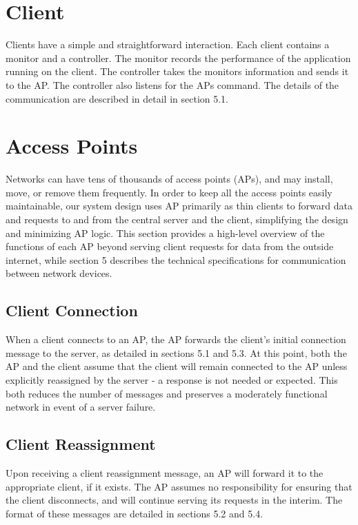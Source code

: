 \documentclass[10pt,journal,compsoc]{IEEEtran}
\begin{document}
		\section{Client}
		Clients have a simple and straightforward interaction. Each client contains a monitor and a controller. The monitor records the performance of the application running on the client. The controller takes the monitors information and sends it to the AP. The controller also listens for the APs command. The details of the communication are described in detail in section 5.1.
		
		\section{Access Points}
		Networks can have tens of thousands of access points (APs), and may install, move, or remove them frequently. In order to keep all the access points easily maintainable, our system design uses AP primarily as thin clients to forward data and requests to and from the central server and the client, simplifying the design and minimizing AP logic. This section provides a high-level overview of the functions of each AP beyond serving client requests for data from the outside internet, while section 5 describes the technical specifications for communication between network devices.
		\subsection{Client Connection}
		When a client connects to an AP, the AP forwards the client's initial connection message to the server, as detailed in sections 5.1 and 5.3. At this point, both the AP and the client assume that the client will remain connected to the AP unless explicitly reassigned by the server - a response is not needed or expected. This both reduces the number of messages and preserves a moderately functional network in event of a server failure.
		\subsection{Client Reassignment} Upon receiving a client reassignment message, an AP will forward it to the appropriate client, if it exists. The AP assumes no responsibility for ensuring that the client disconnects, and will continue serving its requests in the interim. The format of these messages are detailed in sections 5.2 and 5.4.
\end{document}
